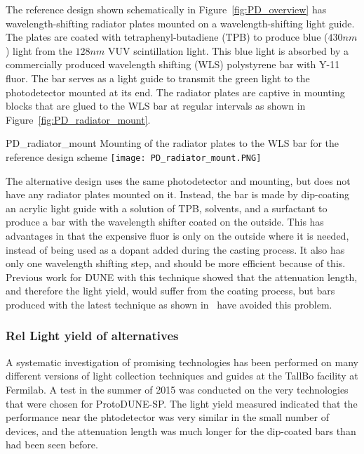 The reference design shown schematically in Figure~\ref{fig:PD_overview}
has wavelength-shifting radiator plates mounted on a wavelength-shifting light guide.
The plates are coated 
with tetraphenyl-butadiene (TPB) to produce blue ($430nm$) light from the $128nm$ VUV 
scintillation light.  
This blue light is absorbed by a commercially produced wavelength shifting (WLS)
polystyrene bar with Y-11 fluor.  
The bar serves as a light guide to transmit the green light to the photodetector 
mounted at its end.
The radiator plates are captive in mounting blocks that are glued to the WLS bar
at regular intervals as shown in Figure~\ref{fig:PD_radiator_mount}.
\begin{cdrfigure}{PD_radiator_mount}
  {Mounting of the radiator plates to the WLS bar for the reference design scheme}
\texttt{[image: PD\_radiator\_mount.PNG]}
\end{cdrfigure}

The alternative design uses the same photodetector and mounting, but does not have
any radiator plates mounted on it.  
Instead, the bar is made by dip-coating an acrylic light guide with a solution
of TPB, solvents, and a surfactant to produce a bar with the wavelength shifter coated
on the outside.  
This has advantages in that the expensive fluor is only on the outside where it is
needed, instead of being used as a dopant added during the casting process.  
It also has only one wavelength shifting step, and should be more efficient because
of this.  
Previous work for DUNE with this technique showed that the attenuation length, and
therefore the light yield, would suffer from the coating process, but bars produced with
the latest technique as shown in~\cite{conrad_jinst} have %
avoided this problem.

\subsubsection{Rel Light yield of alternatives}

A systematic investigation of promising technologies has been performed on 
many different versions of light collection techniques and guides at the 
TallBo facility at Fermilab.
A test in the summer of 2015 was conducted on the very technologies that 
were chosen for ProtoDUNE-SP. 
The light yield measured indicated that the performance near the phtodetector
was very similar in the small number of devices, and the attenuation length
was much longer for the dip-coated bars than had been seen before. 

